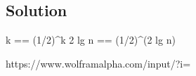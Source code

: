 \subsection*{Solution}

k == (1/2)^k
2 lg n == (1/2)^(2 lg n)

https://www.wolframalpha.com/input/?i=%
